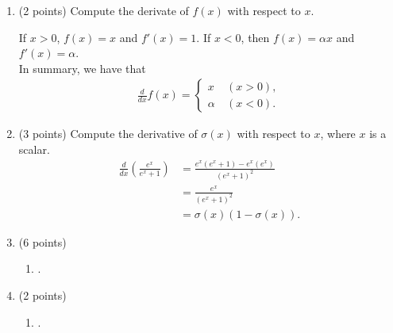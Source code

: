 \documentclass{article}
\begin{document}
\begin{enumerate}[label=(\alph*)]
    \item (2 points) Compute the derivate of $f(x)$ with respect to $x$.
    
    \noindent If $x> 0$, $f(x)=x$ and $f'(x)=1$. If $x<0$, then $f(x)=\alpha x$ and $f'(x)= \alpha$.\\
    In summary, we have that
    \begin{align*}
        \frac{d}{dx}f(x) = \begin{cases}
            x\ &(x>0),\\
            \alpha\ &(x<0).
        \end{cases}
    \end{align*}

    \item (3 points) Compute the derivative of $\sigma(x)$ with respect to $x$, where $x$ is a scalar.
    \begin{align*}
        \frac{d}{dx} \left( \frac{e^x}{e^x +1} \right) &= \frac{e^x(e^x+1) - e^x(e^x)}{(e^x + 1)^2}\\
        &= \frac{e^x}{(e^x+1)^2} \\
        &= \sigma(x)(1-\sigma(x)).
    \end{align*}

    \item (6 points)
    \begin{enumerate}[label=(\roman*)]
        \item .
    \end{enumerate}

    \item (2 points)
    \begin{enumerate}[label=(\roman*)]
        \item .
    \end{enumerate}
\end{enumerate}
\end{document}
